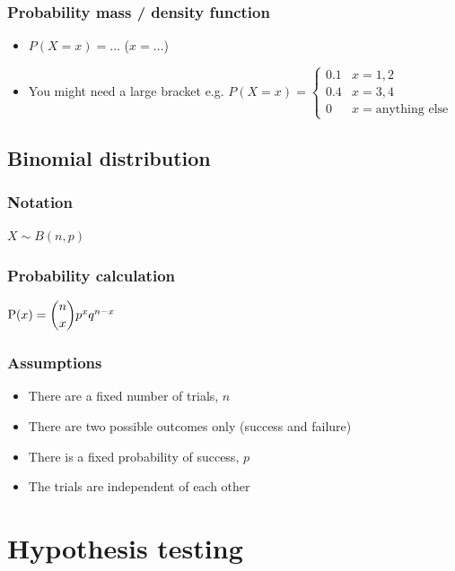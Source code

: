 \documentclass[fleqn, 11pt]{article}
\begin{document}
	\subsubsection{Probability mass / density function}
	\begin{itemize}
		\item $P(X=x) = \dots$ ($x=\dots$)
		\item You might need a large bracket e.g. \begin{math}
			P(X=x) = \begin{cases}
				0.1 & x=1, 2\\
				0.4 & x=3, 4\\
				0 & x=\text{anything else}
			\end{cases}  
		\end{math}
	\end{itemize}
	
	\subsection{Binomial distribution}
	\subsubsection{Notation}
	$X \sim B(n,p)$
	\subsubsection{Probability calculation}
	$\text{P}(x) = \dbinom{n}{x} p^x q^{n-x}$
	\subsubsection{Assumptions}
	\begin{itemize}
		\item There are a fixed number of trials, $n$
		\item There are two possible outcomes only (success and failure)
		\item There is a fixed probability of success, $p$
		\item The trials are independent of each other
	\end{itemize}
	
	
	
	
	\pagebreak
	
	
	\section{Hypothesis testing}
\end{document}
